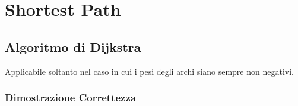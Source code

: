 \documentclass[../template]{subfiles}
\begin{document}
\section{Shortest Path}
\subsection{Algoritmo di Dijkstra}
Applicabile soltanto nel caso in cui i pesi degli archi siano sempre non negativi.


\subsubsection{Dimostrazione Correttezza}
\end{document}

